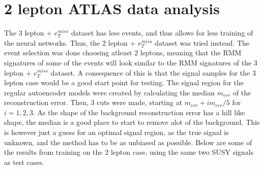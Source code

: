 \newpage 
\section{2 lepton ATLAS data analysis}

The 3 lepton + $e_T^{miss}$ dataset has less events, and thus allows for less training of the neural networks. 
Thus, the 2 lepton + $e_T^{miss}$ dataset was tried instead. The event selection was done choosing atleast 
2 leptons, meaning that the RMM signatures of some of the events will look similar to the RMM signatures of 
the 3 lepton + $e_T^{miss}$ dataset. A consequence of this is that the signal samples for the 3 lepton case 
would be a good start point for testing. The signal region for the regular autoencoder models were created by 
calculating the median $m_{err}$ of the reconstruction error. Then, 3 cuts were made, starting at 
$m_{err} + im_{err}/5$ for $i = 1,2,3$. As the shape of the background reconstruction error has a hill like 
shape, the median is a good place to start to remove alot of the background. This is however just a guess 
for an optimal signal region, as the true signal is unknown, and the method has to be as unbiased as possible. 
Below are some of the results from training on the 2 lepton case, using the same two SUSY signals as test cases. 


